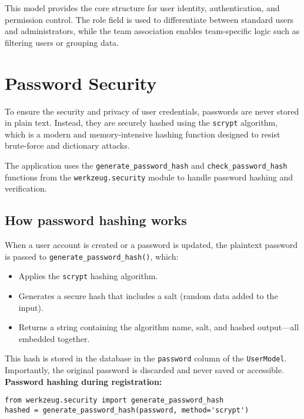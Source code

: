 \documentclass[12pt]{article}
\begin{document}
\noindent This model provides the core structure for user identity, authentication, and permission control. The role field is used to differentiate between standard users and administrators, while the team association enables team-specific logic such as filtering users or grouping data.


\section{Password Security}

To ensure the security and privacy of user credentials, passwords are never stored in plain text. Instead, they are securely hashed using the \texttt{scrypt} algorithm, which is a modern and memory-intensive hashing function designed to resist brute-force and dictionary attacks.

\noindent The application uses the \texttt{generate\_password\_hash} and \texttt{check\_password\_hash} functions from the \texttt{werkzeug.security} module to handle password hashing and verification.

\subsection*{How password hashing works}

When a user account is created or a password is updated, the plaintext password is passed to \texttt{generate\_password\_hash()}, which:
\begin{itemize}
  \item Applies the \texttt{scrypt} hashing algorithm.
  \item Generates a secure hash that includes a salt (random data added to the input).
  \item Returns a string containing the algorithm name, salt, and hashed output—all embedded together.
\end{itemize}

\noindent This hash is stored in the database in the \texttt{password} column of the \texttt{UserModel}. Importantly, the original password is discarded and never saved or accessible. \\

\noindent \textbf{Password hashing during registration:}
\begin{verbatim}
from werkzeug.security import generate_password_hash
hashed = generate_password_hash(password, method='scrypt')
\end{verbatim}
\end{document}
